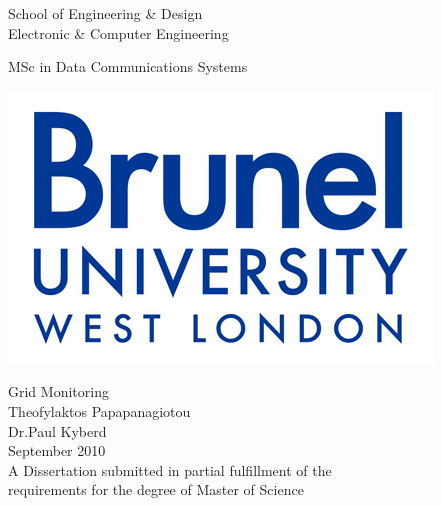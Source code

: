 
\thispagestyle{empty}

\begin{center}
\Large
School of Engineering \& Design\\
Electronic \& Computer Engineering\\
\vspace{1\baselineskip}

MSc in Data Communications Systems\\
\vspace{1\baselineskip}

\begin{center}
\includegraphics{images/brunellogo.jpg}\\
\end{center}
\vspace{1\baselineskip}

\Huge
Grid Monitoring\\
\vspace{1.5\baselineskip}
\Huge
Theofylaktos Papapanagiotou\\
Dr.Paul Kyberd\\
\vspace{1\baselineskip}
\large
September 2010\\
\vspace{0.5\baselineskip}
\large
A Dissertation submitted in partial fulfillment of the\\
requirements for the degree of Master of Science
\end{center}